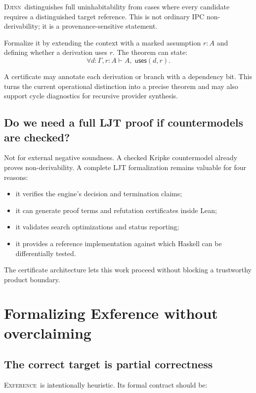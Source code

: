 \documentclass[11pt,letterpaper,openany]{report}
\theoremstyle{definition}
\theoremstyle{remark}
\newcommand{\Djinn}{\textsc{Djinn}}
\newcommand{\Exference}{\textsc{Exference}}
\begin{document}
\Djinn\ distinguishes full uninhabitability from cases where every candidate requires a distinguished target reference. This is not ordinary IPC non-derivability; it is a provenance-sensitive statement.

Formalize it by extending the context with a marked assumption \(r:A\) and defining whether a derivation uses \(r\). The theorem can state:
\[
  \forall d:\Gamma,r:A\vdash A,\; \mathsf{uses}(d,r).
\]

A certificate may annotate each derivation or branch with a dependency bit. This turns the current operational distinction into a precise theorem and may also support cycle diagnostics for recursive provider synthesis.

\section{Do we need a full LJT proof if countermodels are checked?}

Not for external negative soundness. A checked Kripke countermodel already proves non-derivability. A complete LJT formalization remains valuable for four reasons:

\begin{itemize}
\item it verifies the engine's decision and termination claims;
\item it can generate proof terms and refutation certificates inside Lean;
\item it validates search optimizations and status reporting;
\item it provides a reference implementation against which Haskell can be differentially tested.
\end{itemize}

The certificate architecture lets this work proceed without blocking a trustworthy product boundary.

\chapter{Formalizing Exference without overclaiming}
\label{ch:exference}

\section{The correct target is partial correctness}

\Exference\ is intentionally heuristic. Its formal contract should be:
\end{document}
